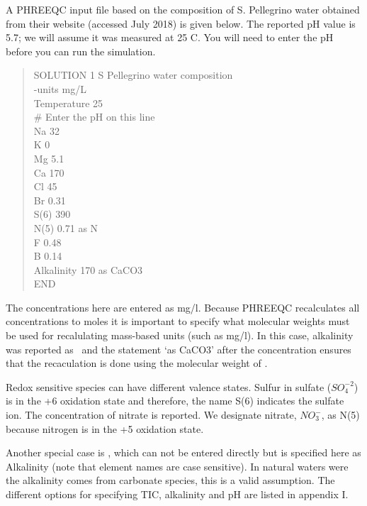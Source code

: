 A PHREEQC input file based on the composition of S. Pellegrino water obtained from their 
website (accessed July 2018) is given below.  
The reported pH value is 5.7; we will assume it was measured at 25 C.  
You will need to enter the pH before you can run the simulation.

\begin{quote}
{\color{red}SOLUTION 1  S Pellegrino water composition \\
-units mg/L \\
Temperature	25 \\
\# Enter the pH on this line \\
Na	32 \\
K	0 \\
Mg	5.1 \\
Ca	170 \\
Cl	45 \\
Br	0.31 \\
S(6)	390 \\
N(5)	0.71 as N	 \\
F	0.48 \\
B	0.14 \\
Alkalinity	170  as CaCO3 \\
END }\\
\end{quote}


The concentrations here are entered as mg/l. Because PHREEQC recalculates all concentrations to moles it is important to specify what molecular weights must be used for recalulating mass-based units (such as mg/l). In this case, alkalinity was reported as \cc\ and the statement `as CaCO3' after the concentration ensures that the recaculation is done using the molecular weight of \cc. 

Redox sensitive species can have different valence states. Sulfur
in sulfate ($SO_4^{-2}$) is in the +6 oxidation state and therefore, the name
S(6) indicates the sulfate ion. The concentration of nitrate is reported.  
We designate nitrate, $NO_3^{-}$, as N(5) because nitrogen is in the +5 oxidation state.  


Another special case is \bi, which can not be entered directly but is specified here as Alkalinity (note that element names are case sensitive). In natural waters were the alkalinity comes from carbonate species, this is a valid assumption. The different options for specifying TIC, alkalinity and pH are listed in appendix I.

